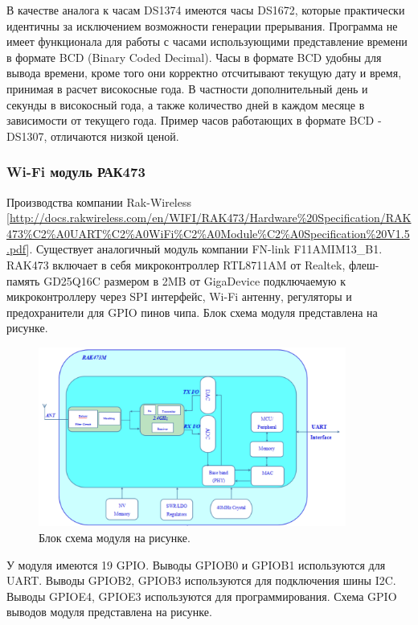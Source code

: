 В качестве аналога к часам DS1374 имеются часы DS1672, которые практически идентичны за исключением возможности генерации прерывания. 
Программа не имеет функционала для работы с часами использующими представление времени в формате BCD (Binary Coded Decimal). Часы в формате BCD удобны для вывода времени, кроме того они корректно отсчитывают текущую дату и время, принимая в расчет високосные года. В частности дополнительный день и секунды в високосный года, а также количество дней в каждом месяце в зависимости от текущего года. 
Пример часов работающих в формате BCD - DS1307, отличаются низкой ценой.


\subsubsection{ Wi-Fi модуль РАК473 }
Производства компании Rak-Wireless [\url{http://docs.rakwireless.com/en/WIFI/RAK473/Hardware%20Specification/RAK473%C2%A0UART%C2%A0WiFi%C2%A0Module%C2%A0Specification%20V1.5.pdf}]. 
Существует аналогичный модуль компании FN-link F11AMIM13\_B1. RAK473 включает в себя микроконтроллер RTL8711AM от Realtek, флеш-память GD25Q16C размером в 2MB от GigaDevice подключаемую к микроконтроллеру через SPI интерфейс, Wi-Fi антенну, регуляторы и предохранители для GPIO пинов чипа. Блок схема модуля представлена на рисунке.

\begin{figure}[h!]
    \centering
    \includegraphics[width=0.9\textwidth]{rak473_block_diagram.png}
    \caption{Блок схема модуля на рисунке.}
\end{figure}

У модуля имеются 19 GPIO. 
Выводы GPIOB0 и GPIOB1 используются для UART.
Выводы GPIOB2, GPIOB3 используются для подключения шины I2C.
Выводы GPIOE4, GPIOE3 используются для программирования.
Схема GPIO выводов модуля представлена на рисунке.


